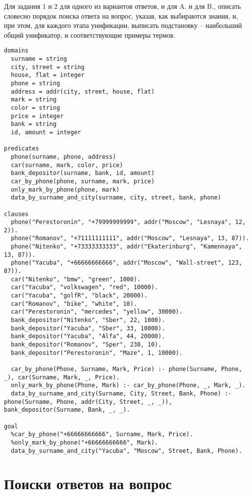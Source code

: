Для задания 1 и 2 для одного из вариантов ответов, и для A. и для B., описать словесно порядок поиска ответа на вопрос, указав, как выбираются знания, и, при этом, для каждого этапа унификации, выписать подстановку – наибольший общий унификатор, и соответствующие примеры термов.

\begin{lstlisting}
domains
  surname = string
  city, street = string
  house, flat = integer
  phone = string
  address = addr(city, street, house, flat)
  mark = string
  color = string
  price = integer
  bank = string
  id, amount = integer
  
predicates
  phone(surname, phone, address)
  car(surname, mark, color, price)
  bank_depositor(surname, bank, id, amount)
  car_by_phone(phone, surname, mark, price)
  only_mark_by_phone(phone, mark)
  data_by_surname_and_city(surname, city, street, bank, phone)
  
clauses
  phone("Perestoronin", "+79999999999", addr("Moscow", "Lesnaya", 12, 2)).
  phone("Romanov", "+71111111111", addr("Moscow", "Lesnaya", 13, 87)).
  phone("Nitenko", "+73333333333", addr("Ekaterinburg", "Kamennaya", 13, 87)).
  phone("Yacuba", "+66666666666", addr("Moscow", "Wall-street", 123, 87)).
  car("Nitenko", "bmw", "green", 1000).
  car("Yacuba", "volkswagen", "red", 10000).
  car("Yacuba", "golfR", "black", 20000).
  car("Romanov", "bike", "white", 10).
  car("Perestoronin", "mercedes", "yellow", 30000).
  bank_depositor("Nitenko", "Sber", 22, 1000).
  bank_depositor("Yacuba", "Sber", 33, 10000).
  bank_depositor("Yacuba", "Alfa", 44, 20000).
  bank_depositor("Romanov", "Sper", 238, 10).
  bank_depositor("Perestoronin", "Maze", 1, 10000).
  
  car_by_phone(Phone, Surname, Mark, Price) :- phone(Surname, Phone, _), car(Surname, Mark, _, Price).
  only_mark_by_phone(Phone, Mark) :- car_by_phone(Phone, _, Mark, _).
  data_by_surname_and_city(Surname, City, Street, Bank, Phone) :- phone(Surname, Phone, addr(City, Street, _, _)), bank_depositor(Surname, Bank, _, _).
  
goal
  %car_by_phone("+66666666666", Surname, Mark, Price).
  %only_mark_by_phone("+66666666666", Mark).
  data_by_surname_and_city("Yacuba", "Moscow", Street, Bank, Phone).
\end{lstlisting}


\section{Поиски ответов на вопрос}

